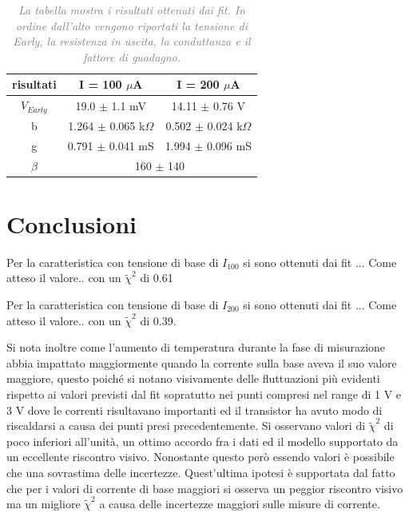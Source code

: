 \documentclass[a4paper,11pt]{article}
\begin{document}
\begin{table}[htbp] %
\begin{center}
\begin{tabular}{ |c|c|c| }
\hline
risultati & I = 100 $\mu$A & I = 200 $\mu$A \\ 
\hline
$V_{Early}$ & 19.0 $\pm$ 1.1 mV & 14.11 $\pm$ 0.76 V \\  
\hline
b & 1.264 $\pm$ 0.065 k$\Omega$ & 0.502 $\pm$ 0.024 k$\Omega$ \\
\hline
g & 0.791 $\pm$ 0.041 mS & 1.994 $\pm$ 0.096 mS \\
\hline
$\beta$ & \multicolumn{2}{|c|}{160 $\pm$ 140} \\
\hline
\end{tabular}
\caption{\textit{\textcolor{gray}{La tabella mostra i risultati ottenuti dai fit. In ordine dall'alto vengono riportati la tensione di Early, la resistenza in uscita, la conduttanza e il fattore di guadagno.}}}
\label{tab::risultati}
\end{center}
\end{table}



\section{Conclusioni}
Per la caratteristica con tensione di base di $I_{100}$ si sono ottenuti dai fit ... Come atteso il valore..
con un $\tilde\chi^2$ di 0.61

Per la caratteristica con tensione di base di $I_{200}$ si sono ottenuti dai fit ... Come atteso il valore..
con un $\tilde\chi^2$ di 0.39.

Si nota inoltre come l'aumento di temperatura durante la fase di misurazione abbia impattato maggiormente quando la corrente sulla base aveva il suo valore maggiore, questo poiché si notano visivamente delle fluttuazioni più evidenti rispetto ai valori previsti dal fit sopratutto nei punti compresi nel range di 1 V e 3 V dove le correnti risultavano importanti ed il transistor ha avuto modo di riscaldarsi a causa dei punti presi precedentemente.
Si osservano  valori di $\tilde\chi^2$ di poco inferiori all'unità, un ottimo accordo fra i dati ed il modello supportato da un eccellente riscontro visivo. Nonostante questo però essendo valori è possibile che una sovrastima delle incertezze. Quest'ultima ipotesi è supportata dal fatto che per i valori di corrente di base maggiori si osserva un peggior riscontro visivo ma un migliore $\tilde\chi^2$ a causa delle incertezze maggiori sulle misure di corrente.
\end{document}
